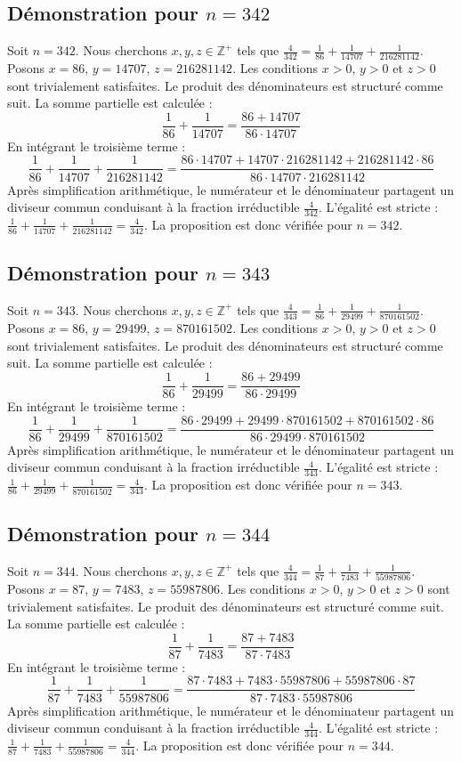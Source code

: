 \documentclass[11pt,a4paper]{article}
\begin{document}
\subsection{Démonstration pour $n = 342$}
Soit $n = 342$. Nous cherchons $x, y, z \in \mathbb{Z}^{+}$ tels que $\frac{4}{342} = \frac{1}{86} + \frac{1}{14707} + \frac{1}{216281142}$.
Posons $x = 86$, $y = 14707$, $z = 216281142$.
Les conditions $x > 0$, $y > 0$ et $z > 0$ sont trivialement satisfaites.
Le produit des dénominateurs est structuré comme suit. La somme partielle est calculée :
$$ \frac{1}{86} + \frac{1}{14707} = \frac{86+14707}{86 \cdot 14707} $$
En intégrant le troisième terme :
$$ \frac{1}{86} + \frac{1}{14707} + \frac{1}{216281142} = \frac{86 \cdot 14707 + 14707 \cdot 216281142 + 216281142 \cdot 86}{86 \cdot 14707 \cdot 216281142} $$
Après simplification arithmétique, le numérateur et le dénominateur partagent un diviseur commun conduisant à la fraction irréductible $\frac{4}{342}$.
L'égalité est stricte : $\frac{1}{86} + \frac{1}{14707} + \frac{1}{216281142} = \frac{4}{342}$.
La proposition est donc vérifiée pour $n = 342$.
\subsection{Démonstration pour $n = 343$}
Soit $n = 343$. Nous cherchons $x, y, z \in \mathbb{Z}^{+}$ tels que $\frac{4}{343} = \frac{1}{86} + \frac{1}{29499} + \frac{1}{870161502}$.
Posons $x = 86$, $y = 29499$, $z = 870161502$.
Les conditions $x > 0$, $y > 0$ et $z > 0$ sont trivialement satisfaites.
Le produit des dénominateurs est structuré comme suit. La somme partielle est calculée :
$$ \frac{1}{86} + \frac{1}{29499} = \frac{86+29499}{86 \cdot 29499} $$
En intégrant le troisième terme :
$$ \frac{1}{86} + \frac{1}{29499} + \frac{1}{870161502} = \frac{86 \cdot 29499 + 29499 \cdot 870161502 + 870161502 \cdot 86}{86 \cdot 29499 \cdot 870161502} $$
Après simplification arithmétique, le numérateur et le dénominateur partagent un diviseur commun conduisant à la fraction irréductible $\frac{4}{343}$.
L'égalité est stricte : $\frac{1}{86} + \frac{1}{29499} + \frac{1}{870161502} = \frac{4}{343}$.
La proposition est donc vérifiée pour $n = 343$.
\subsection{Démonstration pour $n = 344$}
Soit $n = 344$. Nous cherchons $x, y, z \in \mathbb{Z}^{+}$ tels que $\frac{4}{344} = \frac{1}{87} + \frac{1}{7483} + \frac{1}{55987806}$.
Posons $x = 87$, $y = 7483$, $z = 55987806$.
Les conditions $x > 0$, $y > 0$ et $z > 0$ sont trivialement satisfaites.
Le produit des dénominateurs est structuré comme suit. La somme partielle est calculée :
$$ \frac{1}{87} + \frac{1}{7483} = \frac{87+7483}{87 \cdot 7483} $$
En intégrant le troisième terme :
$$ \frac{1}{87} + \frac{1}{7483} + \frac{1}{55987806} = \frac{87 \cdot 7483 + 7483 \cdot 55987806 + 55987806 \cdot 87}{87 \cdot 7483 \cdot 55987806} $$
Après simplification arithmétique, le numérateur et le dénominateur partagent un diviseur commun conduisant à la fraction irréductible $\frac{4}{344}$.
L'égalité est stricte : $\frac{1}{87} + \frac{1}{7483} + \frac{1}{55987806} = \frac{4}{344}$.
La proposition est donc vérifiée pour $n = 344$.
\end{document}
